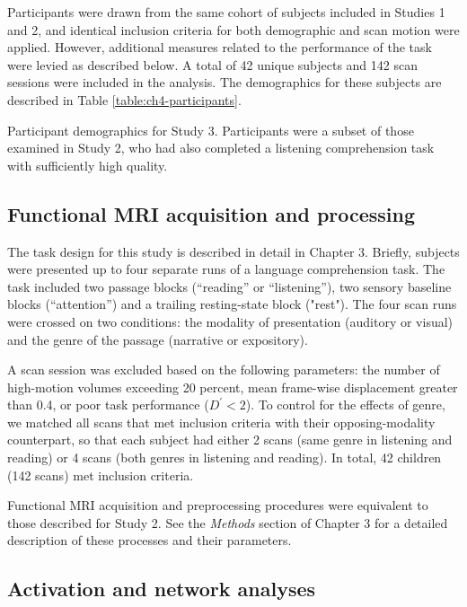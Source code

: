 Participants were drawn from the same cohort of subjects included in Studies 1 and 2, and identical inclusion criteria for both demographic and scan motion were applied. However, additional measures related to the performance of the task were levied as described below. A total of 42 unique subjects and 142 scan sessions were included in the analysis. The demographics for these subjects are described in Table \ref{table:ch4-participants}.

\begin{table}[t]
	\renewcommand{\tabcolsep}{0.09cm}
	\centering
	
	\caption[Participant demographics for Study 3]{Participant demographics for Study 3. Participants were a subset of those examined in Study 2, who had also completed a listening comprehension task with sufficiently high quality.}
	\label{table:ch4-participants}
\end{table}

\subsection{Functional MRI acquisition and processing}

The task design for this study is described in detail in Chapter 3. Briefly, subjects were presented up to four separate runs of a language comprehension task. The task included two passage blocks (``reading'' or ``listening''), two sensory baseline blocks (``attention'') and a trailing resting-state block ("rest"). The four scan runs were crossed on two conditions: the modality of presentation (auditory or visual) and the genre of the passage (narrative or expository). 

A scan session was excluded based on the following parameters: the number of high-motion volumes exceeding 20 percent, mean frame-wise displacement greater than 0.4, or poor task performance ($D^\prime < 2$). To control for the effects of genre, we matched all scans that met inclusion criteria with their opposing-modality counterpart, so that each subject had either 2 scans (same genre in listening and reading) or 4 scans (both genres in listening and reading). In total, 42 children (142 scans) met inclusion criteria.

Functional MRI acquisition and preprocessing procedures were equivalent to those described for Study 2. See the \textit{Methods} section of Chapter 3 for a detailed description of these processes and their parameters.

\subsection{Activation and network analyses}

